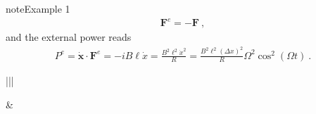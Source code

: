 \documentclass[letterpaper,10pt,italian]{jupyterBook}
\begin{document}
\begin{sphinxadmonition}{note}{Example 1}
\begin{equation*}
\begin{split}\mathbf{F}^e = - \mathbf{F} \ ,\end{split}
\end{equation*}
\sphinxAtStartPar
and the external power reads
\begin{equation*}
\begin{split}P^e = \dot{\mathbf{x}} \cdot \mathbf{F}^e = - i B \ell \dot{x} = \frac{B^2 \ell^2 \dot{x}^2}{R} = \frac{B^2 \ell^2 \left(\Delta x\right)^2}{R} \Omega^2 \cos^2(\Omega t) \ .\end{split}
\end{equation*}

\begin{savenotes}\sphinxattablestart
\centering
\begin{tabular}[t]{|||}
\hline

\sphinxAtStartPar
{}
&
\sphinxAtStartPar
{}
\\
\hline
\end{tabular}
\par
\sphinxattableend\end{savenotes}


\end{sphinxadmonition}
\end{document}
